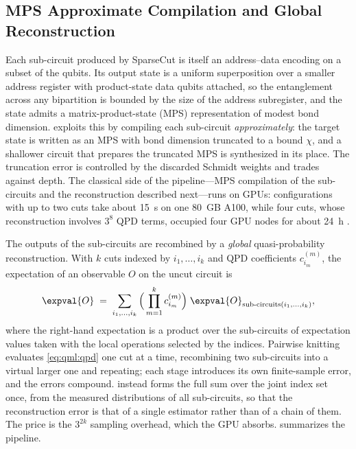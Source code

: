 \subsection{MPS Approximate Compilation and Global Reconstruction}\label{sec:qml:shardq:mps}

Each sub-circuit produced by SparseCut is itself an address--data encoding on a subset of the qubits. Its output state is a uniform superposition over a smaller address register with product-state data qubits attached, so the entanglement across any bipartition is bounded by the size of the address subregister, and the state admits a matrix-product-state (MPS) representation \cite{vidal2003mps,perezgarcia2006mps} of modest bond dimension. \shardq{} exploits this by compiling each sub-circuit \emph{approximately}: the target state is written as an MPS with bond dimension truncated to a bound $\chi$, and a shallower circuit that prepares the truncated MPS is synthesized in its place. The truncation error is controlled by the discarded Schmidt weights and trades against depth. The classical side of the pipeline---MPS compilation of the sub-circuits and the reconstruction described next---runs on GPUs: configurations with up to two cuts take about \SI{15}{\second} on one \SI{80}{GB} A100, while four cuts, whose reconstruction involves $3^{8}$ QPD terms, occupied four GPU nodes for about \SI{24}{\hour} \cite{guo2025shardq}.

The outputs of the sub-circuits are recombined by a \emph{global} quasi-probability reconstruction. With $k$ cuts indexed by $i_1,\dots,i_k$ and QPD coefficients $c^{(m)}_{i_m}$, the expectation of an observable $O$ on the uncut circuit is
\begin{equation}\label{eq:qml:qpd}
\expval{O} \;=\; \sum_{i_1,\dots,i_k} \Big(\prod_{m=1}^{k} c^{(m)}_{i_m}\Big)\; \expval{O}_{\text{sub-circuits}(i_1,\dots,i_k)},
\end{equation}
where the right-hand expectation is a product over the sub-circuits of expectation values taken with the local operations selected by the indices. Pairwise knitting evaluates \cref{eq:qml:qpd} one cut at a time, recombining two sub-circuits into a virtual larger one and repeating; each stage introduces its own finite-sample error, and the errors compound. \shardq{} instead forms the full sum over the joint index set once, from the measured distributions of all sub-circuits, so that the reconstruction error is that of a single estimator rather than of a chain of them. The price is the $3^{2k}$ sampling overhead, which the GPU absorbs.  summarizes the pipeline.

